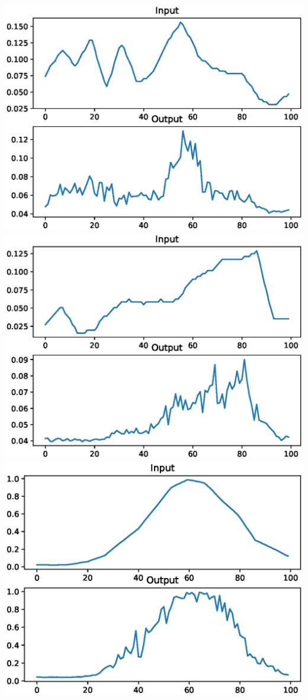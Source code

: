 \documentclass[12pt]{article}
\begin{document}
{\includegraphics[scale=0.5]{example4}
\includegraphics[scale=0.5]{example5}
\includegraphics[scale=0.5]{example6}

}
\end{document}
